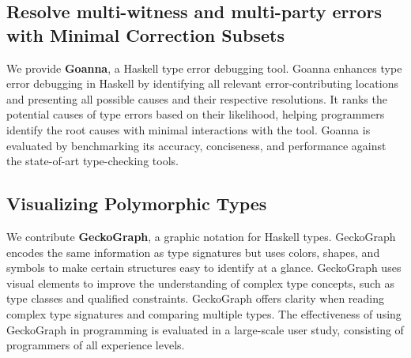 
\subsection*{Resolve multi-witness and multi-party errors with Minimal Correction Subsets}

We provide \textbf{Goanna}, a Haskell type error debugging tool. Goanna enhances type error debugging in Haskell by identifying all relevant error-contributing locations and presenting all possible causes and their respective resolutions. It ranks the potential causes of type errors based on their likelihood, helping programmers identify the root causes with minimal interactions with the tool. Goanna is evaluated by benchmarking its accuracy, conciseness, and performance against the state-of-art type-checking tools.



\subsection*{Visualizing Polymorphic Types}

We contribute \textbf{GeckoGraph}, a graphic notation for Haskell types. GeckoGraph encodes the same information as type signatures but uses colors, shapes, and symbols to make certain structures easy to identify at a glance. GeckoGraph uses visual elements to improve the understanding of complex type concepts, such as type classes and qualified constraints. GeckoGraph offers clarity when reading complex type signatures and comparing multiple types. The effectiveness of using GeckoGraph in programming is evaluated in a large-scale user study, consisting of programmers of all experience levels.

